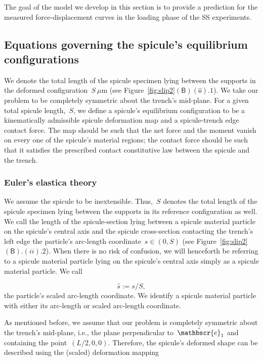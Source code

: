\documentclass[preprint,10pt,times]{elsarticle}
\numberwithin{equation}{section}
\newcommand{\ndL}{L}
\newcommand{\physe}{\hat{\mathbscr{e}}} %
\newcommand{\pr}[1]{\left( #1 \right)}
\newcommand{\subf}[1]{\pr{\textsf{#1}}}
\begin{document}
The goal of the model we develop in this section is to provide a prediction
for the measured force-displacement curves in the loading phase of the
SS experiments.

\subsection{Equations governing the spicule's equilibrium configurations\label{subsec:Governing-equations-of}}

{We denote the total length of the spicule specimen
lying between the supports in the deformed configuration}~{}{$S~\mu$m}{{}
(see Figure~\ref{fig:slip2}}{$\subf{B}$$\subf{ii}.1$}{).}
We take our problem to be completely symmetric about the trench's
mid-plane. For a given total spicule length,~$S$, we define a spicule's
equilibrium configuration to be a kinematically admissible spicule
deformation map and a spicule-trench edge contact force. The map should
be such that the net force and the moment vanish on every one of the spicule's
material regions; the contact force should be such that it satisfies the
prescribed contact constitutive law between the spicule and the trench.

\subsubsection{Euler's elastica theory\label{subsec:Euler's-Elastica-theory}}

{We assume the spicule to be inextensible. Thus,~}{$S$}{{}
denotes the total length of the spicule specimen lying between the
supports in its reference configuration as well.} We call the length
of the spicule-section lying between a spicule material particle on
the spicule's central axis and the spicule cross-section contacting
the trench's left edge the particle's arc-length coordinate~$s\in (0,S)$
({see Figure~\ref{fig:slip2}}{$\subf{B}.(ii).2$}).
When there is no risk of confusion, we will henceforth be referring
to a spicule material particle lying on the spicule's central axis
simply as a spicule material particle. We call

\begin{equation}
\label{eq:shat}
\hat{s}:=s/S,
\end{equation}the particle's scaled arc-length coordinate.{{} We
identify a} spicule material particle with either its arc-length or
scaled arc-length coordinate.

As mentioned before, we assume that our problem is completely symmetric
about the trench's mid-plane, i.e., the plane perpendicular to~$\physe_1$
and containing the point~$(\ndL/2,0,0)$. Therefore,
the spicule's deformed shape can be described using the (scaled) deformation
mapping
\end{document}

